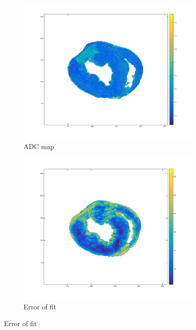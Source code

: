 \begin{figure}[h!]
    \centering
    \begin{subfigure}{.31\textwidth}
        \includegraphics[width=\textwidth]{figures/pig6_adc_24}
        \caption{ADC map}
        \label{fig:pig6_adc}
    \end{subfigure}
    \begin{subfigure}{.31\textwidth}
        \includegraphics[width=\textwidth]{figures/pig6_err_24}
        \caption{Error of fit}
        \label{fig:pig6_err}
    \end{subfigure}

\end{figure}
